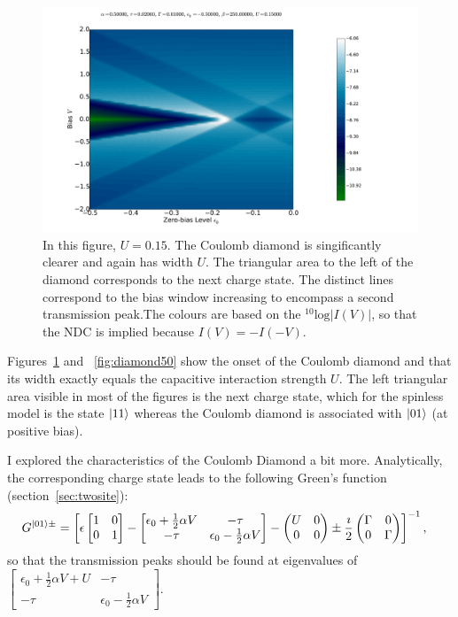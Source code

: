 \begin{figure}[htb]
    \centering
    \includegraphics[height=.38\textheight]{pdf/coulombd/current_map_u2.pdf}
    \caption{In this figure, $U=0.15$. The Coulomb diamond is singificantly clearer and again has width $U$. The triangular area to the left of the diamond corresponds to the next charge state. The distinct lines correspond to the bias window increasing to encompass a second transmission peak.The colours are based on the $^{10}\text{log}\left|I(V)\right|$, so that the NDC is implied because $I(V) = -I(-V)$.}
    \label{fig:currentmap2}
\end{figure} 

Figures~\ref{fig:currentmap2} and ~\ref{fig:diamond50} show the onset of the Coulomb diamond and that its width exactly equals the capacitive interaction strength $U$. The left triangular area visible in most of the figures is the next charge state, which for the spinless model is the state $\ket{11}$ whereas the Coulomb diamond is associated with $\ket{01}$ (at positive bias). 

I explored the characteristics of the Coulomb Diamond a bit more. Analytically, the corresponding charge state leads to the following Green's function (section~\ref{sec:twosite}):
\begin{align*}
G^{\ket{01}\pm} &= \left[ \epsilon \begin{bmatrix} 1 & 0 \\ 0 & 1 \end{bmatrix} - \begin{bmatrix} \epsilon_0 + \frac{1}{2} \alpha V & -\tau \\
-\tau & \epsilon_0 - \frac{1}{2} \alpha V\end{bmatrix} - \begin{pmatrix} U & 0 \\ 0 & 0 \end{pmatrix} \pm \frac{\imath}{2} \begin{pmatrix} \Gamma & 0 \\ 0 & \Gamma \end{pmatrix} \right]^{-1},
\end{align*}
so that the transmission peaks should be found at eigenvalues of $\begin{bmatrix} \epsilon_0 + \frac{1}{2} \alpha V+U & -\tau \\
-\tau & \epsilon_0 - \frac{1}{2} \alpha V\end{bmatrix}$.

